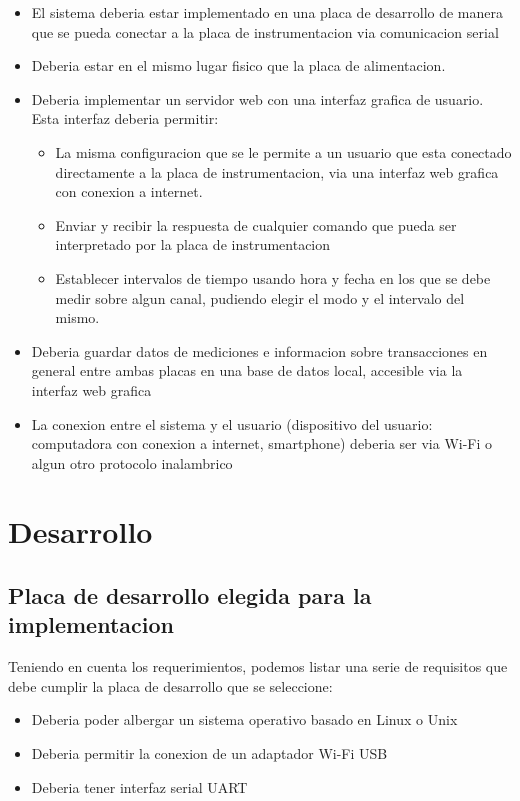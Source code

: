 \begin{itemize}
\item El sistema deberia estar implementado en una placa de desarrollo de manera que se pueda conectar a la placa de instrumentacion via comunicacion serial
\item Deberia estar en el mismo lugar fisico que la placa de alimentacion.
\item Deberia implementar un servidor web con una interfaz grafica de usuario. Esta interfaz deberia permitir:
\begin{itemize}
	\item La misma configuracion que se le permite a un usuario que esta conectado directamente a la placa de instrumentacion, via una interfaz web grafica con conexion a internet. 
	\item Enviar y recibir la respuesta de cualquier comando que pueda ser interpretado por la placa de instrumentacion
	\item Establecer intervalos de tiempo usando hora y fecha en los que se debe medir sobre algun canal, pudiendo elegir el modo y el intervalo del mismo.
\end{itemize}
\item Deberia guardar datos de mediciones e informacion sobre transacciones en general entre ambas placas en una base de datos local, accesible via la interfaz web grafica 
\item La conexion entre el sistema y el usuario (dispositivo del usuario: computadora con conexion a internet, smartphone) deberia ser via Wi-Fi o algun otro protocolo inalambrico
\end{itemize}



\section{Desarrollo} %
\label{sec:desarrollo}

\subsection{Placa de desarrollo elegida para la implementacion} %
\label{sub:placa_de_desarrollo_elegida_para_la_implementacion}

Teniendo en cuenta los requerimientos, podemos listar una serie de requisitos que debe cumplir la placa de desarrollo que se seleccione:

\begin{itemize}
	\item Deberia poder albergar un sistema operativo basado en Linux o Unix
	\item Deberia permitir la conexion de un adaptador Wi-Fi USB
	\item Deberia tener interfaz serial UART
\end{itemize}

